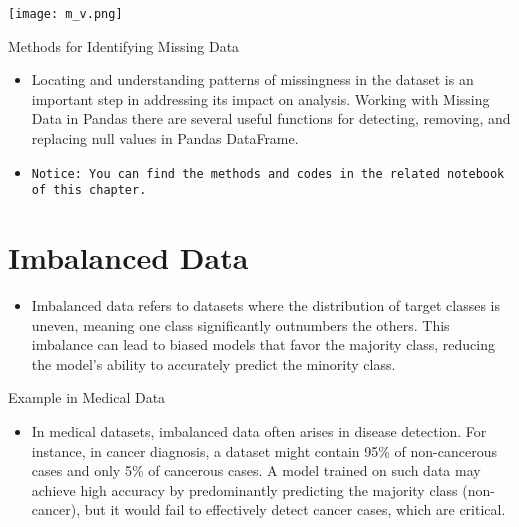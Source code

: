 \documentclass[serif, aspectratio=169]{beamer}
\begin{document}
\begin{frame}
    \centering
    \texttt{[image: m\_v.png]}
\end{frame}

\begin{frame}{Methods for Identifying Missing Data}
    \begin{itemize}
        \item Locating and understanding patterns of missingness in the dataset is an important step in addressing its impact on analysis. Working with Missing Data in Pandas there are several useful functions for detecting, removing, and replacing null values in Pandas DataFrame. 
        \item \texttt{\color{red}Notice: You can find the methods and codes in the related notebook of this chapter.}
    \end{itemize}
\end{frame}

\section{Imbalanced Data}
\begin{frame}
    \begin{itemize}
        \item Imbalanced data refers to datasets where the distribution of target classes is uneven, meaning one class significantly outnumbers the others. This imbalance can lead to biased models that favor the majority class, reducing the model's ability to accurately predict the minority class.
    \end{itemize}
\end{frame}

\begin{frame}{Example in Medical Data}
    \begin{itemize}
        \item In medical datasets, imbalanced data often arises in disease detection. For instance, in cancer diagnosis, a dataset might contain 95\% of non-cancerous cases and only 5\% of cancerous cases. A model trained on such data may achieve high accuracy by predominantly predicting the majority class (non-cancer), but it would fail to effectively detect cancer cases, which are critical.
    \end{itemize}
\end{frame}
\end{document}

